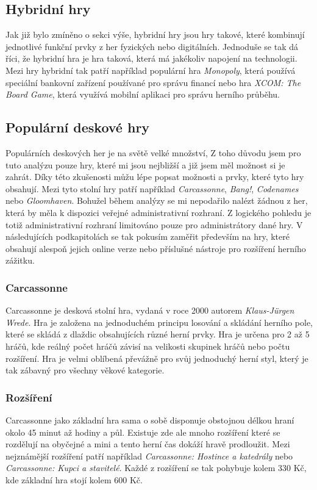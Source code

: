 \subsection*{Hybridní hry}
\label{subsec:popular-board-games-analysis-hybrid-games}
Jak již bylo zmíněno o sekci výše, hybridní hry jsou hry takové, které kombinují jednotlivé funkční prvky z her fyzických nebo digitálních. Jednoduše se tak dá říci, že hybridní hra je hra taková, která má jakékoliv napojení na technologii. Mezi hry hybridní tak patří například populární hra \textit{Monopoly}, která používá speciální bankovní zařízení používané pro správu financí nebo hra \textit{XCOM: The Board Game}, která využívá mobilní aplikaci pro správu herního průběhu.

\subsection{Populární deskové hry}
\label{subsec:popular-board-games-analysis-popular-games}
Populárních deskových her je na světě velké množství, Z toho důvodu jsem pro tuto analýzu pouze hry, které mi jsou nejbližší a již jsem měl možnost si je zahrát. Díky této zkušenosti můžu lépe popsat možnosti a prvky, které tyto hry obsahují. Mezi tyto stolní hry patří například \textit{Carcassonne}, \textit{Bang!}, \textit{Codenames} nebo \textit{Gloomhaven}. Bohužel během analýzy se mi nepodařilo nalézt žádnou z her, která by měla k dispozici veřejné administrativní rozhraní. Z logického pohledu je totiž administrativní rozhraní limitováno pouze pro administrátory dané hry. V následujících podkapitolách se tak pokusím zaměřit především na hry, které obsahují alespoň jejich online verze nebo příslušné nástroje pro rozšíření herního zážitku.

\subsubsection{Carcassonne}
\label{subsubsec:popular-board-games-analysis-carcassonne}
Carcassonne je desková stolní hra, vydaná v roce 2000 autorem \textit{Klaus-Jürgen Wrede}. Hra je založena na jednoduchém principu losování a skládání herního pole, které se skládá z dlaždic obsahujících různé herní prvky. Hra je určena pro 2 až 5 hráčů, kde reálný počet hráčů závisí na velikosti skupinek hráčů nebo počtu rozšíření. Hra je velmi oblíbená převážně pro svůj jednoduchý herní styl, který je tak zábavný pro všechny věkové kategorie.

\subsubsection*{Rozšíření}
\label{subsubsec:popular-board-games-analysis-carcassonne-expansions}
Carcassonne jako základní hra sama o sobě disponuje obstojnou délkou hraní okolo 45 minut až hodiny a půl. Existuje zde ale mnoho rozšíření které se rozdělují na obyčejné a mini a tento herní čas dokáží hravě prodloužit. Mezi nejznámější rozšíření patří například \textit{Carcassonne: Hostince a katedrály} nebo \textit{Carcassonne: Kupci a stavitelé}. Každé z rozšíření se tak pohybuje kolem 330 Kč, kde základní hra stojí kolem 600 Kč.

